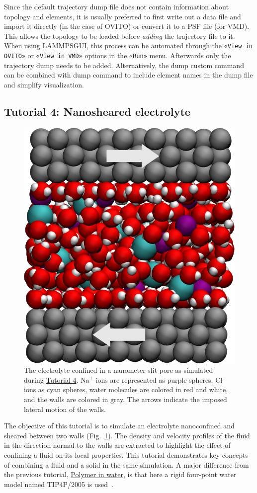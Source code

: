 \documentclass[9pt,tutorial]{livecoms}
\newcommand{\lmpcmd}[1]{\hspace{0pt}\colorbox{listing}{\textcolor{command}{\small{#1}}}\hspace{0pt}} %
\newcommand{\guicmd}[1]{\textcolor{command}{\texttt{«#1»}}} %
\newcommand{\lammpsgui}{\textsf{LAMMPS\textendash GUI}}
\begin{document}
\begin{note}
  Since the {\color{blue}default} trajectory dump file does not contain information about
  topology and elements, it is usually preferred to first write out a
  data file and import it directly (in the case of OVITO) or convert it
  to a PSF file (for VMD).  This allows the topology to be loaded before
  \emph{adding} the trajectory file to it.  When using \lammpsgui{},
  this process can be automated through the \guicmd{View in OVITO} or
  \guicmd{View in VMD} options in the \guicmd{Run} menu.  Afterwards
  only the trajectory dump needs to be added.  {\color{blue}Alternatively, the
  \lmpcmd{dump custom} command can be combined with \lmpcmd{dump} command to
  include element names in the dump file and simplify visualization.}
\end{note}

\subsection{Tutorial 4: Nanosheared electrolyte}
\label{sheared-confined-label}

\begin{figure}
\centering
\includegraphics[width=0.55\linewidth]{NANOSHEAR}
\caption{The electrolyte confined in a nanometer slit pore as simulated during
\hyperref[sheared-confined-label]{Tutorial 4}.  $\text{Na}^+$ ions are represented
as purple spheres, $\text{Cl}^-$ ions as cyan spheres, water molecules are colored
in red and white, and the walls are colored in gray.  The arrows indicate the
imposed lateral motion of the walls.}
\label{fig:NANOSHEAR}
\end{figure}

The objective of this tutorial is to simulate an electrolyte
nanoconfined and sheared between two walls (Fig.~\ref{fig:NANOSHEAR}).  The density
and velocity profiles of the fluid in the direction normal to the walls are
extracted to highlight the effect of confining a fluid on its local properties.
This tutorial demonstrates key concepts of combining a fluid and a solid in
the same simulation.  A major difference from the previous tutorial,
\hyperref[all-atom-label]{Polymer in water}, is that here a rigid four-point
water model named TIP4P/2005 is used~\cite{abascal2005general}.
\end{document}
